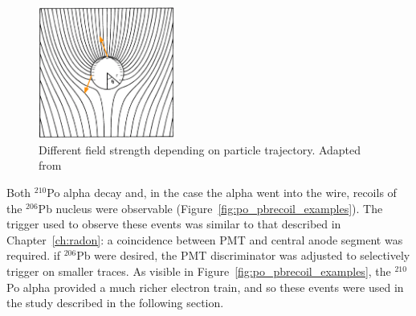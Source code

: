 \begin{figure}[htbp]
\begin{center}
\includegraphics[width=0.4\textwidth]{figures/etrains/field_variation.png}
\caption{Different field strength depending on particle trajectory. Adapted from \cite{Blum2008} }
\label{fig:field_variation}
\end{center}
\end{figure}

Both $^{210}$Po alpha decay and, in the case the alpha went into the wire, recoils of the $^{206}$Pb nucleus were observable (Figure~\ref{fig:po_pbrecoil_examples}). The trigger used to observe these events was similar to that described in Chapter~\ref{ch:radon}: a coincidence between \ac{PMT} and central anode segment was required. if $^{206}$Pb were desired, the \ac{PMT} discriminator was adjusted to selectively trigger on smaller traces. As visible in Figure~\ref{fig:po_pbrecoil_examples}, the $^{210}$Po alpha provided a much richer electron train, and so these events were used in the study described in the following section.

